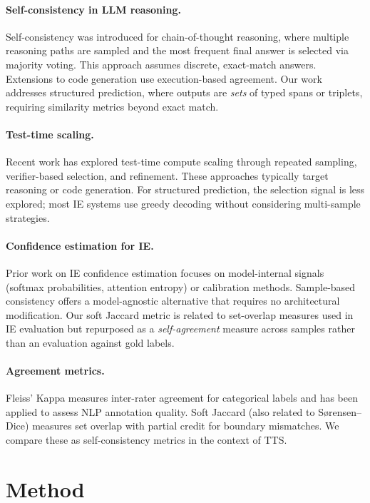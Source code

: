 \documentclass[11pt,a4paper]{article}
\begin{document}
\paragraph{Self-consistency in LLM reasoning.}
Self-consistency was introduced for chain-of-thought reasoning, where multiple reasoning paths are sampled and the most frequent final answer is selected via majority voting. This approach assumes discrete, exact-match answers. Extensions to code generation use execution-based agreement. Our work addresses structured prediction, where outputs are \emph{sets} of typed spans or triplets, requiring similarity metrics beyond exact match.

\paragraph{Test-time scaling.}
Recent work has explored test-time compute scaling through repeated sampling, verifier-based selection, and refinement. These approaches typically target reasoning or code generation. For structured prediction, the selection signal is less explored; most IE systems use greedy decoding without considering multi-sample strategies.

\paragraph{Confidence estimation for IE.}
Prior work on IE confidence estimation focuses on model-internal signals (softmax probabilities, attention entropy) or calibration methods. Sample-based consistency offers a model-agnostic alternative that requires no architectural modification. Our soft Jaccard metric is related to set-overlap measures used in IE evaluation but repurposed as a \emph{self-agreement} measure across samples rather than an evaluation against gold labels.

\paragraph{Agreement metrics.}
Fleiss' Kappa measures inter-rater agreement for categorical labels and has been applied to assess NLP annotation quality. Soft Jaccard (also related to S{\o}rensen--Dice) measures set overlap with partial credit for boundary mismatches. We compare these as self-consistency metrics in the context of TTS.

\section{Method}
\end{document}
